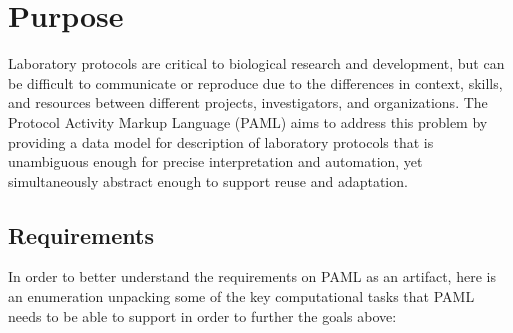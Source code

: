 \section{Purpose}

Laboratory protocols are critical to biological research and development, but can be difficult to communicate or reproduce due to the differences in context, skills, and resources between different projects, investigators, and organizations.
The Protocol Activity Markup Language (PAML) aims to address this problem by providing a data model for description of laboratory protocols that is unambiguous enough for precise interpretation and automation, yet simultaneously abstract enough to support reuse and adaptation.

\subsection{Requirements}

In order to better understand the requirements on PAML as an artifact, here is an enumeration unpacking some of the key computational tasks that PAML needs to be able to support in order to further the goals above:

